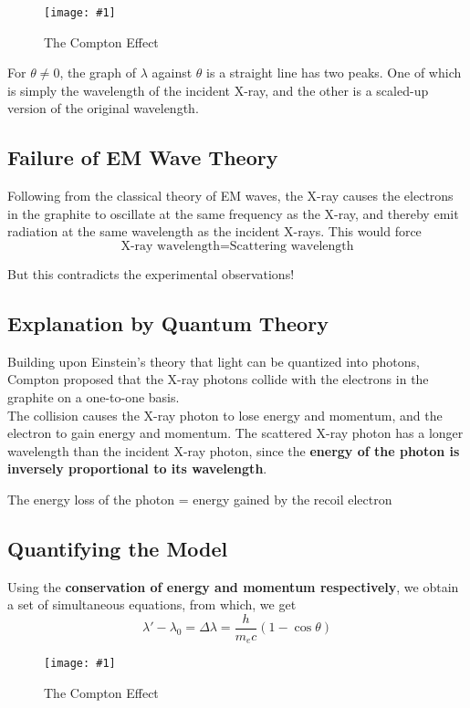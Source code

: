 \documentclass[a4paper,12pt]{article}
\newcommand{\lb}{\\[8pt]}
\newcommand{\img}[4]{\begin{center}
  \begin{figure}[H]
    \centering
    \texttt{[image: \#1]}
    \caption{#3}
    \label{fig:#4}
  \end{figure}
\end{center}}
\begin{document}
\img{compton.png}{1}{The Compton Effect}{compton}

For $\theta \not = 0$, the graph of $\lambda$ against $\theta$ is a straight line has two peaks. One of which is simply the wavelength of the incident X-ray, and the other is a scaled-up version of the original wavelength.

\pagebreak

\subsection{Failure of EM Wave Theory}

Following from the classical theory of EM waves, the X-ray causes the electrons in the graphite to oscillate at the same frequency as the X-ray, and thereby emit radiation at the same wavelength as the incident X-rays. This would force $$\text{X-ray wavelength} = \text{Scattering wavelength}$$

But this contradicts the experimental observations!

\subsection{Explanation by Quantum Theory}

Building upon Einstein's theory that light can be quantized into photons, Compton proposed that the X-ray photons collide with the electrons in the graphite on a one-to-one basis. \lb
The collision causes the X-ray photon to lose energy and momentum, and the electron to gain energy and momentum. The scattered X-ray photon has a longer wavelength than the incident X-ray photon, since the \textbf{energy of the photon is inversely proportional to its wavelength}.\lb
\begin{center}
  The energy loss of the photon = energy gained by the recoil electron
\end{center}


\subsection{Quantifying the Model}

Using the \textbf{conservation of energy and momentum respectively}, we obtain a set of simultaneous equations, from which, we get \begin{equation}\label{eq:compton_wavelength_change}
  \lambda' - \lambda_0  = \Delta \lambda = \frac{h}{m_ec}(1-\cos \theta)
\end{equation}
\img{compton2.png}{1}{The Compton Effect}{compton2}
\end{document}
